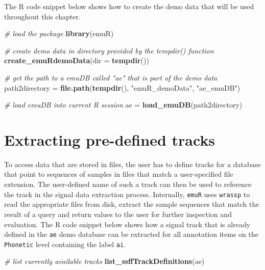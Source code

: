 \documentclass[]{book}
\newenvironment{Shaded}{\begin{snugshade}}{\end{snugshade}}
\newcommand{\CommentTok}[1]{\textcolor[rgb]{0.56,0.35,0.01}{\textit{#1}}}
\newcommand{\DataTypeTok}[1]{\textcolor[rgb]{0.13,0.29,0.53}{#1}}
\newcommand{\KeywordTok}[1]{\textcolor[rgb]{0.13,0.29,0.53}{\textbf{#1}}}
\newcommand{\NormalTok}[1]{#1}
\newcommand{\StringTok}[1]{\textcolor[rgb]{0.31,0.60,0.02}{#1}}
\theoremstyle{definition}
\theoremstyle{definition}
\theoremstyle{definition}
\theoremstyle{remark}
\begin{document}
The R code snippet below shows how to create the demo data that will be
used throughout this chapter.

\begin{Shaded}
\begin{Highlighting}[]
\CommentTok{# load the package}
\KeywordTok{library}\NormalTok{(emuR)}

\CommentTok{# create demo data in directory provided by the tempdir() function}
\KeywordTok{create_emuRdemoData}\NormalTok{(}\DataTypeTok{dir =} \KeywordTok{tempdir}\NormalTok{())}

\CommentTok{# get the path to a emuDB called "ae" that is part of the demo data}
\NormalTok{path2directory =}\StringTok{ }\KeywordTok{file.path}\NormalTok{(}\KeywordTok{tempdir}\NormalTok{(), }\StringTok{"emuR_demoData"}\NormalTok{, }\StringTok{"ae_emuDB"}\NormalTok{)}

\CommentTok{# load emuDB into current R session}
\NormalTok{ae =}\StringTok{ }\KeywordTok{load_emuDB}\NormalTok{(path2directory)}
\end{Highlighting}
\end{Shaded}

\hypertarget{extracting-pre-defined-tracks}{%
\section{Extracting pre-defined
tracks}\label{extracting-pre-defined-tracks}}

To access data that are stored in files, the user has to define tracks
for a database that point to sequences of samples in files that match a
user-specified file extension. The user-defined name of such a track can
then be used to reference the track in the signal data extraction
process. Internally, \texttt{emuR} uses \texttt{wrassp} to read the
appropriate files from disk, extract the sample sequences that match the
result of a query and return values to the user for further inspection
and evaluation. The R code snippet below shows how a signal track that
is already defined in the \texttt{ae} demo database can be extracted for
all annotation items on the \texttt{Phonetic} level containing the label
\texttt{ai}.

\begin{Shaded}
\begin{Highlighting}[]
\CommentTok{# list currently available tracks}
\KeywordTok{list_ssffTrackDefinitions}\NormalTok{(ae)}
\end{Highlighting}
\end{Shaded}
\end{document}
